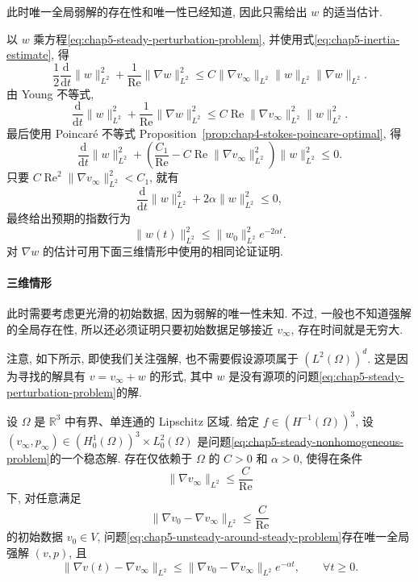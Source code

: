 \begin{Proof}
此时唯一全局弱解的存在性和唯一性已经知道, 因此只需给出 $w$ 的适当估计.

以 $w$ 乘方程\eqref{eq:chap5-steady-perturbation-problem}, 并使用式\eqref{eq:chap5-inertia-estimate}, 得
\[
 \frac12\frac{\mathrm d}{\mathrm dt}\|w\|_{L^2}^2
 +\frac1{\operatorname{Re}}\|\nabla w\|_{L^2}^2
 \leq C\|\nabla v_\infty\|_{L^2}\|w\|_{L^2}\|\nabla w\|_{L^2}.
\]
由 Young 不等式,
\[
 \frac{\mathrm d}{\mathrm dt}\|w\|_{L^2}^2
 +\frac1{\operatorname{Re}}\|\nabla w\|_{L^2}^2
 \leq C\operatorname{Re}\|\nabla v_\infty\|_{L^2}^2\|w\|_{L^2}^2.
\]
最后使用 Poincaré 不等式 Proposition~\ref{prop:chap4-stokes-poincare-optimal}, 得
\[
 \frac{\mathrm d}{\mathrm dt}\|w\|_{L^2}^2
 +\left(\frac {C_1}{\operatorname{Re}}
 -C\operatorname{Re}\|\nabla v_\infty\|_{L^2}^2\right)\|w\|_{L^2}^2\leq0.
\]
只要 $C\operatorname{Re}^2\|\nabla v_\infty\|_{L^2}^2<C_1$, 就有
\[
 \frac{\mathrm d}{\mathrm dt}\|w\|_{L^2}^2+2\alpha\|w\|_{L^2}^2\leq0,
\]
最终给出预期的指数行为
\[
 \|w(t)\|_{L^2}^2\leq\|w_0\|_{L^2}^2e^{-2\alpha t}.
\]
对 $\nabla w$ 的估计可用下面三维情形中使用的相同论证证明.
\end{Proof}

\paragraph{三维情形}
\label{subsec:chap5-steady-asymptotic-three-dimensional}

此时需要考虑更光滑的初始数据, 因为弱解的唯一性未知. 不过, 一般也不知道强解的全局存在性, 所以还必须证明只要初始数据足够接近 $v_\infty$, 存在时间就是无穷大.

注意, 如下所示, 即使我们关注强解, 也不需要假设源项属于 $(L^2(\Omega))^d$. 这是因为寻找的解具有 $v=v_\infty+w$ 的形式, 其中 $w$ 是没有源项的问题\eqref{eq:chap5-steady-perturbation-problem}的解.

\begin{Theorem}
\label{thm:chap5-steady-asymptotic-three-dimensional}
设 $\Omega$ 是 $\mathbb R^3$ 中有界、单连通的 Lipschitz 区域. 给定 $f\in(H^{-1}(\Omega))^3$, 设 $(v_\infty,p_\infty)\in(H_0^1(\Omega))^3\times L_0^2(\Omega)$ 是问题\eqref{eq:chap5-steady-nonhomogeneous-problem}的一个稳态解. 存在仅依赖于 $\Omega$ 的 $C>0$ 和 $\alpha>0$, 使得在条件
\[
 \|\nabla v_\infty\|_{L^2}\leq\frac C{\operatorname{Re}}
\]
下, 对任意满足
\[
 \|\nabla v_0-\nabla v_\infty\|_{L^2}\leq\frac C{\operatorname{Re}}
\]
的初始数据 $v_0\in V$, 问题\eqref{eq:chap5-unsteady-around-steady-problem}存在唯一全局强解 $(v,p)$, 且
\[
 \|\nabla v(t)-\nabla v_\infty\|_{L^2}
 \leq\|\nabla v_0-\nabla v_\infty\|_{L^2}e^{-\alpha t},
 \qquad\forall t\geq0.
\]
\end{Theorem}

